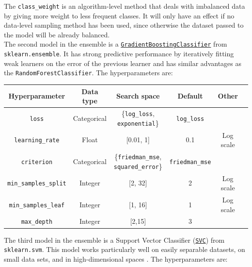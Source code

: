 \documentclass[11pt]{article}
\begin{document}
The \texttt{class\_weight} is an algorithm-level method that deals with imbalanced data by giving more weight to less frequent classes. It will only have an effect if no data-level sampling method has been used, since otherwise the dataset passed to the model will be already balanced. \\

The second model in the ensemble is a \href{https://scikit-learn.org/stable/modules/generated/sklearn.ensemble.GradientBoostingClassifier.html}{\texttt{GradientBoostingClassifier}} from \texttt{sklearn.ensemble}. It has strong predictive performance by iteratively fitting weak learners on the error of the previous learner and has similar advantages as the \texttt{RandomForestClassifier}. The hyperparameters are:

\begin{table}[H]
\centering
\begin{tabular}{ | c | c | c | c | c | c | }
 \hline
  Hyperparameter & Data type & Search space & Default & Other \\
 \hline
 \texttt{loss} & Categorical & \{\texttt{log\_loss}, \texttt{exponential}\} & \texttt{log\_loss} &  \\ 
 \texttt{learning\_rate} & Float & [0.01, 1] & 0.1 & Log scale  \\ 
 \texttt{criterion} & Categorical & \{\texttt{friedman\_mse}, \texttt{squared\_error}\} & \texttt{friedman\_mse} &   \\ 
 \texttt{min\_samples\_split} & Integer & [2, 32] & 2 & Log scale \\ 
 \texttt{min\_samples\_leaf} & Integer & [1, 16] & 1 & Log scale  \\
 \texttt{max\_depth}  & Integer & [2,15] & 3 &  \\ 
 \hline
\end{tabular}
\end{table}

\newpage
The third model in the ensemble is a Support Vector Classifier (\href{https://scikit-learn.org/stable/modules/generated/sklearn.svm.SVC.html#sklearn.svm.SVC}{\texttt{SVC}}) from \texttt{sklearn.svm}. This model works particularly well on easily separable datasets, on small data sets, and in high-dimensional spaces \citep{GfG}. The hyperparameters are:
\end{document}
